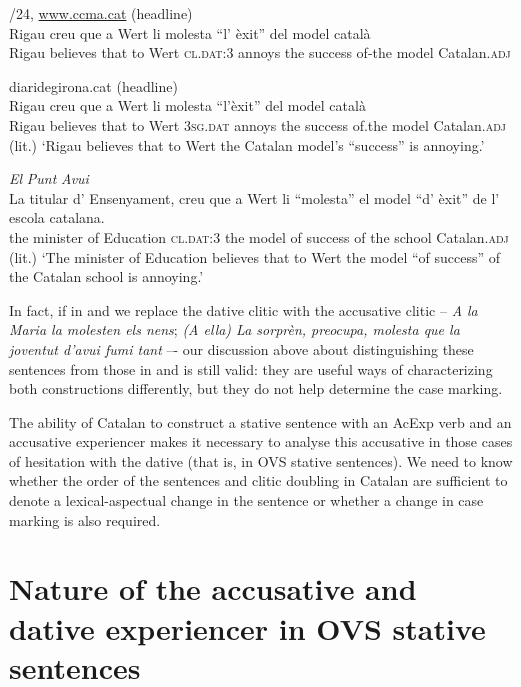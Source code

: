\documentclass[output=paper,colorlinks,citecolor=brown,modfonts,nonflat]{langsci/langscibook}
\begin{document}
\ea%
 \label{ex:royo:7}
 /24, \url{www.ccma.cat} (headline)\\
 \gll Rigau creu que a Wert li molesta “l' èxit” del model català\\
 Rigau believes that to Wert \textsc{cl.dat:3} annoys the success of-the model Catalan.\textsc{adj}\\
 \glt {}
 
 \ex diaridegirona.cat (headline)\\
 \gll Rigau creu que a Wert li molesta “l’èxit” del model català\\
Rigau believes that to Wert \textsc{3sg.dat} annoys   the success of.the model Catalan.\textsc{adj} \\
 \glt (lit.) ‘Rigau believes that to Wert the Catalan model’s “success” is annoying.’
 
 \ex \emph{El} \emph{Punt} \emph{Avui}\\
 \gll La titular d’ Ensenyament, creu que a Wert li “molesta” el model “d’ èxit” de l’ escola catalana.\\
 the minister of Education \textsc{cl.dat:3} the model of success of the school Catalan.\textsc{adj}\\
 \glt (lit.) ‘The minister of Education believes that to Wert the model “of success” of the Catalan school
is annoying.’ 
 \z
 \z


In fact, if in  and  we replace the dative clitic with the accusative clitic – \textit{A la Maria la molesten els nens}; \textit{(A ella) La sorprèn, preocupa, molesta que la joventut d’avui fumi tant} –- our discussion above about distinguishing these sentences from those in  and  is still valid: they are useful ways of characterizing both constructions differently, but they do not help determine the case marking.

The ability of Catalan to construct a stative sentence with an AcExp verb and an accusative experiencer makes it necessary to analyse this accusative in those cases of hesitation with the dative (that is, in OVS stative sentences). We need to know whether the order of the sentences and clitic doubling in Catalan are sufficient to denote a lexical-aspectual change in the sentence or whether a change in case marking is also required.


\section{Nature of the accusative and dative experiencer in OVS stative sentences}\label{sec:royo:3}
\end{document}
